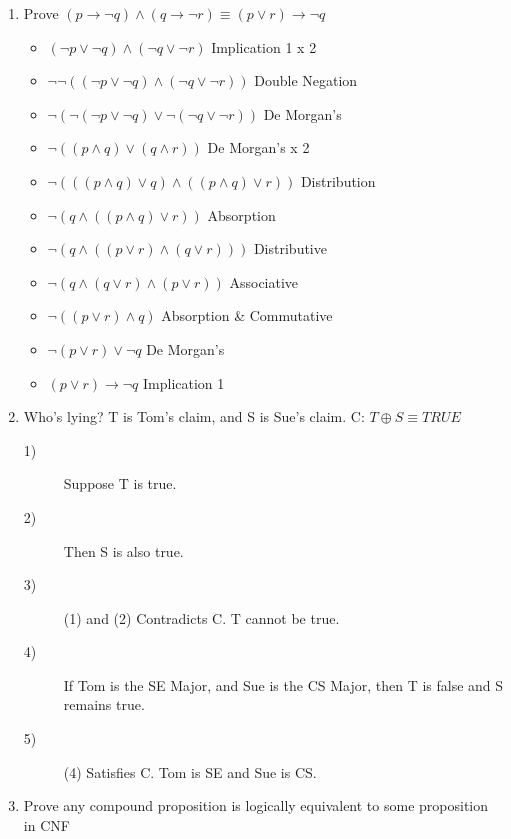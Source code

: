 \documentclass[12pt]{article}
\newcommand{\xor}{\oplus}
\begin{document}
\begin{enumerate}
        \item Prove $(p \to \neg q) \land (q \to \neg r) \equiv (p \lor r) \to \neg q$
            \begin{itemize}
                \item $(\neg p \lor \neg q) \land (\neg q \lor \neg r)$ Implication 1 x 2
                \item $ \neg \neg ((\neg p \lor \neg q) \land (\neg q \lor \neg r))$ Double Negation
                \item $\neg (\neg (\neg p \lor \neg q) \lor \neg (\neg q \lor \neg r))$ De Morgan's
                \item $\neg (( p \land q) \lor ( q \land r))$ De Morgan's x 2
                \item $\neg (((p \land q) \lor q) \land ((p \land q) \lor r))$ Distribution
                \item $\neg (q \land ((p \land q) \lor r))$ Absorption
                \item $\neg (q \land ((p \lor r) \land (q \lor r)))$ Distributive
                \item $\neg (q \land (q \lor r) \land (p \lor r))$ Associative
                \item $\neg ((p \lor r) \land q)$ Absorption \& Commutative
                \item $\neg (p \lor r) \lor \neg q$ De Morgan's
                \item $(p \lor r) \to \neg q$ Implication 1
            \end{itemize}
        \item Who's lying? T is Tom's claim, and S is Sue's claim. C: $T \xor S \equiv TRUE$
            \begin{description}
                \item[1)] Suppose T is true.
                \item[2)] Then S is also true.
                \item[3)] (1) and (2) Contradicts C. T cannot be true.
                \item[4)] If Tom is the SE Major, and Sue is the CS Major, then T is false and S remains true.
                \item[5)] (4) Satisfies C. Tom is SE and Sue is CS.
            \end{description}
        \item Prove any compound proposition is logically equivalent to some proposition in CNF
            \begin{itemize}

\end{itemize}
\end{enumerate}
\end{document}
